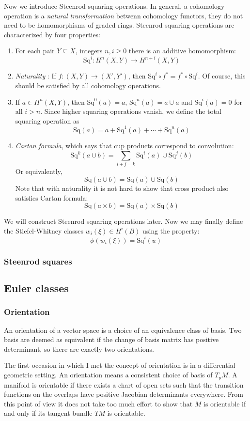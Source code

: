 \documentclass[12pt]{article}
\theoremstyle{plain}
\theoremstyle{definition}
\newcommand{\<}{\langle}
\renewcommand{\>}{\rangle}
\newcommand{\Sq}{\mathrm{Sq}}
\begin{document}
Now we introduce Steenrod squaring operations. In general, a cohomology operation is a \textit{natural transformation} betwenn cohomology functors, they do not need to be homomorphisms of graded rings. Steenrod squaring operations are characterized by four properties:
\begin{enumerate}
\item For each pair $Y \subseteq X$, integers $n, i \ge 0$ there is an additive homomorphism:
$$ \Sq^i : H^n(X, Y) \to H^{n + i}(X, Y) $$
\item \textit{Naturality} : If $f : (X, Y) \to (X', Y')$, then $\Sq^i \circ f^*  = f^* \circ \Sq^i$. Of course, this should be satisfied by all cohomology operations. 
\item If $a \in H^n(X, Y)$, then $\Sq^0(a) = a$, $\Sq^n(a) = a \cup a$ and $\Sq^i(a) = 0$ for all $i > n$. Since higher squaring operations vanish, we define the total squaring operation as 
$$ \Sq(a) = a + \Sq^1(a) + \cdots + \Sq^n(a) $$
\item \textit{Cartan formula}, which says that cup products correspond to convolution:
$$ \Sq^k (a \cup b) = \sum_{i + j = k} \Sq^i(a) \cup \Sq^j(b) $$ Or equivalently, 
$$ \Sq(a \cup b) = \Sq(a) \cup \Sq(b) $$ Note that with naturality it is not hard to show that cross product also satisfies Cartan formula: 
$$ \Sq(a \times b) = \Sq(a) \times \Sq(b) $$
\end{enumerate}
We will construct Steenrod squaring operations later. Now we may finally define the Stiefel-Whitney classes $w_i(\xi) \in H^i(B)$ using the property:
$$ \phi(w_i(\xi)) = \Sq^i(u) $$


\subsubsection{Steenrod squares}

\subsection{Euler classes}
\subsubsection{Orientation}
An orientation of a vector space is a choice of an equivalence class of basis. Two basis are deemed as equivalent if the change of basis matrix has positive determinant, so there are exactly two orientations. 

The first occasion in which I met the concept of orientation is in a differential geometric setting. An orientation means a consistent choice of basis of $T_p M$. A manifold is orientable if there exists a chart of open sets such that the transition functions on the overlaps have positive Jacobian determinants everywhere. From this point of view it does not take too much effort to show that $M$ is orientable if and only if its tangent bundle $TM$ is orientable. 
\end{document}
